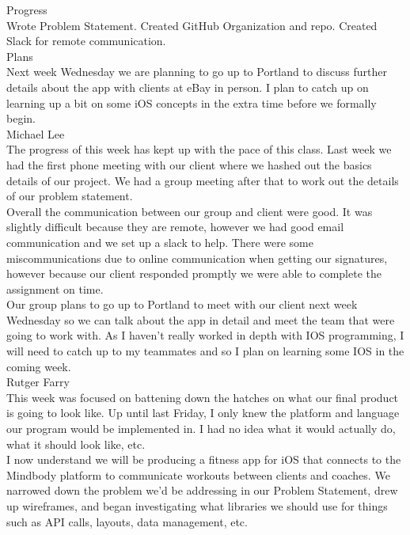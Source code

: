 \documentclass[letterpaper,10pt,titlepage]{article}
\begin{document}
Progress\\
Wrote Problem Statement.
Created GitHub Organization and repo.
Created Slack for remote communication.\\

Plans\\
Next week Wednesday we are planning to go up to Portland to discuss further details about the app with clients at eBay in person.
I plan to catch up on learning up a bit on some iOS concepts in the extra time before we formally begin.\\

Michael Lee\\

The progress of this week has kept up with the pace of this class. Last week we had the first phone meeting with our client where we hashed out the basics details of our project. We had a group meeting after that to work out the details of our problem statement.\\

Overall the communication between our group and client were good. It was slightly difficult because they are remote, however we had good email communication and we set up a slack to help. There were some miscommunications due to online communication when getting our signatures, however because our client responded promptly we were able to complete the assignment on time.\\

Our group plans to go up to Portland to meet with our client next week Wednesday so we can talk about the app in detail and meet the team that were going to work with. As I haven’t really worked in depth with IOS programming, I will need to catch up to my teammates and so I plan on learning some IOS in the coming week.\\

Rutger Farry\\

This week was focused on battening down the hatches on what our final product is going to look like. Up until last Friday, I only knew the platform and language our program would be implemented in. I had no idea what it would actually do, what it should look like, etc.\\

I now understand we will be producing a fitness app for iOS that connects to the Mindbody platform to communicate workouts between clients and coaches. We narrowed down the problem we'd be addressing in our Problem Statement, drew up wireframes, and began investigating what libraries we should use for things such as API calls, layouts, data management, etc.\\
\end{document}
